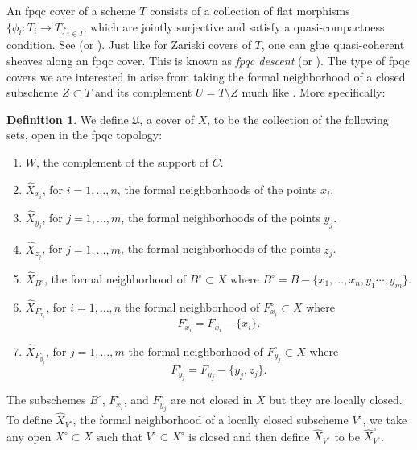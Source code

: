 \documentclass[12pt]{amsart}
\theoremstyle{definition}
\newtheorem{definition}[theorem]{Definition}
\newcommand{\Xhat}{\widehat{X}}
\begin{document}
An fpqc cover of a scheme $T$ consists of a collection of flat
morphisms $\{\phi_i : T_i \rightarrow T\}_{i \in I}$, which are
jointly surjective and satisfy a quasi-compactness condition. See
\cite[Tag 03NV, Def.~54.15.1]{stacks-project} (or
\cite[Def.~2.34]{Vis}). Just like for Zariski covers of $T$, one can
glue quasi-coherent sheaves along an fpqc cover. This is known as
\emph{fpqc descent} \cite[Tag 023R, Prop.~34.5.2]{stacks-project} (or
\cite[Thm.~4.23]{Vis}). The type of fpqc covers we are interested in
arise from taking the formal neighborhood of a closed subscheme $Z
\subset T$ and its complement $U = T \setminus Z$ much like \cite[Tag,
03NV, Ex.~54.15.3(5)]{stacks-project}. More specifically:

\begin{definition}\label{defn: the fpqc cover mathfrak U}
We define $\mathfrak{U}$, a cover of $X$, to be the collection of the
following sets, open in the fpqc topology:\begin{enumerate}
\item $W$, the complement of the support of $C$.
\item $\Xhat_{x_{i}}$, for $i=1,\dotsc ,n$, the formal neighborhoods
of the points $x_{i}$.
\item $\Xhat_{y_{j}}$, for $j=1,\dotsc ,m$, the formal neighborhoods
of the points $y_{j}$.
\item $\Xhat_{z_{j}}$, for $j=1,\dotsc ,m$, the formal neighborhoods
of the points $z_{j}$.
\item $\Xhat_{B^{\circ}}$, the formal neighborhood of
$B^{\circ}\subset X$ where $B^{\circ}=B-\{x_{1},\dotsc
,x_{n},y_{1}\dotsb ,y_{m} \}$. 
\item $\Xhat_{F_{x_{i}}^{\circ}}$, for $i=1,\dotsc ,n$ the formal neighborhood of
$F_{x_{i}}^{\circ}\subset X$ where 
\[
F_{x_{i}}^{\circ}=F_{x_{i}}-\{x_{i} \}.
\]
\item $\Xhat_{F_{y_{j}}^{\circ}}$, for $j=1,\dotsc ,m$ the formal neighborhood of
$F_{y_{j}}^{\circ}\subset X$ where 
\[
F_{y_{j}}^{\circ}=F_{y_{j}}-\{y_{j},z_{j} \}.
\]
\end{enumerate}
\end{definition}

The subschemes $B^{\circ}$, $F_{x_{i}}^{\circ}$, and
$F_{y_{j}}^{\circ}$ are not closed in $X$ but they are locally
closed. To define $\Xhat_{V^{\circ}}$, the formal neighborhood of a
locally closed subscheme $V^{\circ}$, we take any open
$X^{\circ}\subset X$ such that $V^{\circ}\subset X^{\circ}$ is closed
and then define $\Xhat_{V^{\circ}}$ to be $\Xhat^{\circ}_{V^{\circ}}$.
\end{document}
